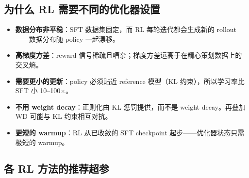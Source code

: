 \subsection{为什么 RL 需要不同的优化器设置}
\label{why-rl-requires-different-optimizer-settings}

\begin{keybox}
\begin{itemize}
  \item \textbf{数据分布非平稳}：SFT 数据集固定，而 RL 每轮迭代都会生成新的 rollout——数据分布随 policy 一起漂移。
  \item \textbf{高梯度方差}：reward 信号稀疏且嘈杂；梯度方差远高于在精心策划数据上的交叉熵。
  \item \textbf{需要更小的更新}：policy 必须贴近 reference 模型（KL 约束），所以学习率比 SFT 小 10--100$\times$。
  \item \textbf{不用 weight decay}：正则化由 KL 惩罚提供，而不是 weight decay。再叠加 WD 可能与 KL 约束相互对抗。
  \item \textbf{更短的 warmup}：RL 从已收敛的 SFT checkpoint 起步——优化器状态只需极短的 warmup。
\end{itemize}
\end{keybox}

\subsection{各 RL 方法的推荐超参}
\label{recommended-hyperparameters-by-rl-method}

